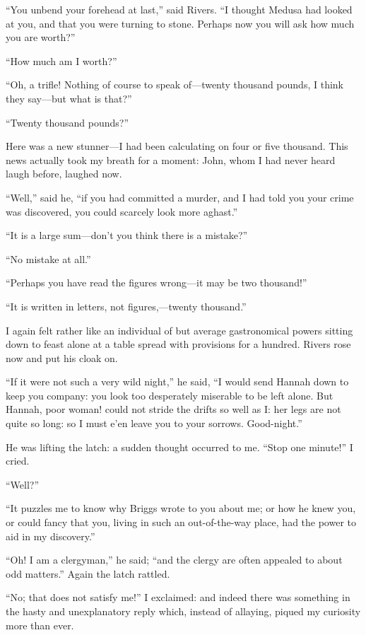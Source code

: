 \enquote{You unbend your forehead at last,} said \Mr{} Rivers. \enquote{I
thought Medusa had looked at you, and that you were turning to stone. 
Perhaps now you will ask how much you are worth?}

\enquote{How much am I worth?}

\enquote{Oh, a trifle! Nothing of course to speak of---twenty thousand
pounds, I think they say---but what is that?}

\enquote{Twenty thousand pounds?}

Here was a new stunner---I had been calculating on four or five
thousand. This news actually took my breath for a moment: \Mr{} \St{} John,
whom I had never heard laugh before, laughed now.

\enquote{Well,} said he, \enquote{if you had committed a murder, and I
had told you your crime was discovered, you could scarcely look more
aghast.}

\enquote{It is a large sum---don't you think there is a mistake?}

\enquote{No mistake at all.}

\enquote{Perhaps you have read the figures wrong---it may be two
thousand!}

\enquote{It is written in letters, not figures,---twenty thousand.}

I again felt rather like an individual of but average gastronomical
powers sitting down to feast alone at a table spread with provisions for
a hundred. \Mr{} Rivers rose now and put his cloak on.

\enquote{If it were not such a very wild night,} he said, \enquote{I
would send Hannah down to keep you company: you look too desperately
miserable to be left alone. But Hannah, poor woman! could not stride
the drifts so well as I: her legs are not quite so long: so I must e'en
leave you to your sorrows. Good-night.}

He was lifting the latch: a sudden thought occurred to me. 
\enquote{Stop one minute!} I cried.

\enquote{Well?}

\enquote{It puzzles me to know why \Mr{} Briggs wrote to you about me; or
how he knew you, or could fancy that you, living in such an
out-of-the-way place, had the power to aid in my discovery.}

\enquote{Oh! I am a clergyman,} he said; \enquote{and the clergy are
often appealed to about odd matters.} Again the latch rattled.

\enquote{No; that does not satisfy me!} I exclaimed: and indeed there
was something in the hasty and unexplanatory reply which, instead of
allaying, piqued my curiosity more than ever.

